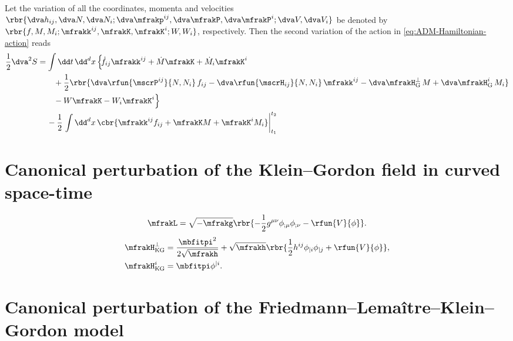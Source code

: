 \documentclass[a4paper,11pt]{article}
\begin{document}
Let the variation of all the coordinates, momenta and velocities
$\rbr{\dva 
h_{ij}, \dva N, \dva N_i;
\dva\mfrakp^{ij}, \dva\mfrakP, \dva\mfrakP^i;
\dva V, \dva V_i}$ be denoted by
$\rbr{f, M, M_i; \mfrakk^{ij}, \mfrakK, \mfrakK^i; W, W_i}$, respectively. Then
the second variation of the action in \cref{eq:ADM-Hamiltonian-action} reads
\begin{align}
\frac{1}{2} \dva^2 S &= \int \dd t\,\dd^d x\,\Big\{\!
\dot f_{ij} \mfrakk^{ij} +\dot M \mfrakK+ \dot{M}_i \mfrakK^i
\nonumber \\
&\qquad
+\frac{1}{2}\rbr{\dva\rfun{\mscrP^{ij}}{N, N_i} \, f_{ij}
-\dva\rfun{\mscrH_{ij}}{N, N_i} \, \mfrakk^{ij}
-\dva\mfrakH^\perp_\text{G} \, M
+\dva\mfrakH^i_\text{G} \, M_i}
\nonumber \\
&\qquad
-W \mfrakK - W_i \mfrakK^i \Big\}
\nonumber \\
&\quad\,
-\frac{1}{2}\left.\int\dd^d x\,
\cbr{\mfrakk^{ij} f_{ij} + \mfrakK M + \mfrakK^i M_i}\right|_{t_1}^{t_2}
\end{align}


\section{Canonical perturbation of the Klein--Gordon field in curved space-time}


\begin{align}
\mfrakL = \sqrt{-\mfrakg}\rbr{-\frac{1}{2}g^{\mu\nu}\phi_{;\mu}\phi_{;\nu}
-\rfun{V}{\phi}}.
\end{align}
\cite[ch.\ 4.2.2]{Kiefer2012}
\begin{align}
\mfrakH^\perp_\text{KG} &= \frac{\mbfitpi^2}{2\sqrt{\mfrakh}} + \sqrt{\mfrakh}
\rbr{\frac{1}{2}h^{ij}\phi_{|i}\phi_{|j}+\rfun{V}{\phi}},\\
\mfrakH^i_\text{KG} &= \mbfitpi \phi^{|i}.
\end{align}





\section{Canonical perturbation of the Friedmann--Lema\^itre--Klein--Gordon 
model}
\end{document}

